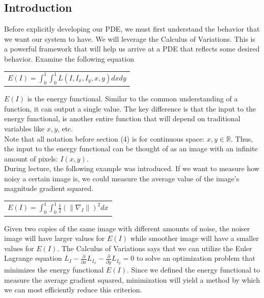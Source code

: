 \documentclass{article}
\begin{document}
  \subsection{Introduction}
  Before explicitly developing our PDE, we must first understand the behavior that we want our system to have.
  We will leverage the Calculus of Variations. This is a powerful framework that will help us arrive at a PDE
  that reflects some desired behavior. Examine the following equation
  \begin{center}
    \begin{tabular}{l}
      $E(I) = \int_{0}^{1} \int_{0}^{1} L(I, I_{x}, I_{y}, x, y) dx dy$
    \end{tabular}
  \end{center}

  \noindent
  $E(I)$ is the energy functional. Similar to the common understanding of a function, it can output
  a single value. The key difference is that the input to the energy functional, is another entire
  function that will depend on traditional variables like $x,y$, etc.\\

  \noindent
  Note that all notation before section (4) is for continuous space: $x,y \in \mathbb{R}$. Thus,
  the input to the energy functional can be thought of as an image with an infinite amount of pixels: $I(x,y)$.\\

  \noindent
  During lecture, the following example was introduced. If we want to measure how noisy a certain image is,
  we could measure the average value of the image's magnitude gradient squared.
  \begin{center}
    \begin{tabular}{l}
      $E(I) = \int_{0}^{1} \int_{0}^{1} \frac{1}{2} (\| \nabla_{I} \|)^{2} dx$
    \end{tabular}
  \end{center}

  \noindent
  Given two copies of the same image with different amounts of noise, the noiser image will have larger values
  for $E(I)$ while smoother image will have a smaller values for $E(I)$. The Calculus of Variations says
  that we can utilize the Euler Lagrange equation
  $L_{I} - \frac{\partial}{\partial x}L_{I_{x}} - \frac{\partial}{\partial y}L_{I_{y}} = 0$ to solve an
  optimization problem that minimizes the energy functional $E(I)$. Since we defined the
  energy functional to measure the average gradient squared, minimization will yield a method
  by which we can most efficiently reduce this criterion.\\
\end{document}
